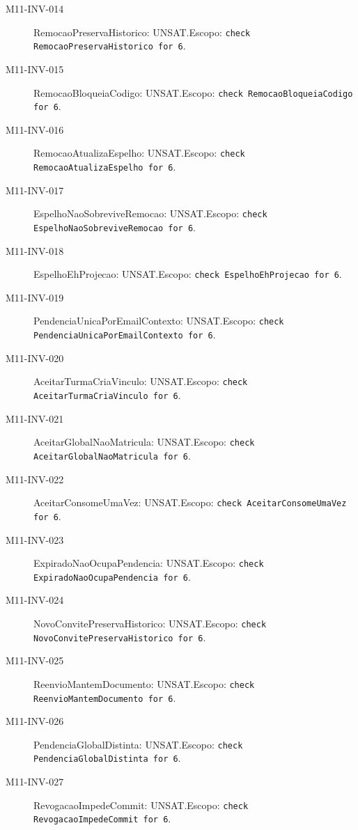 \begin{description}
\item[M11-INV-014] RemocaoPreservaHistorico: UNSAT.\newline Escopo: \texttt{check RemocaoPreservaHistorico for 6}.
\item[M11-INV-015] RemocaoBloqueiaCodigo: UNSAT.\newline Escopo: \texttt{check RemocaoBloqueiaCodigo for 6}.
\item[M11-INV-016] RemocaoAtualizaEspelho: UNSAT.\newline Escopo: \texttt{check RemocaoAtualizaEspelho for 6}.
\item[M11-INV-017] EspelhoNaoSobreviveRemocao: UNSAT.\newline Escopo: \texttt{check EspelhoNaoSobreviveRemocao for 6}.
\item[M11-INV-018] EspelhoEhProjecao: UNSAT.\newline Escopo: \texttt{check EspelhoEhProjecao for 6}.
\item[M11-INV-019] PendenciaUnicaPorEmailContexto: UNSAT.\newline Escopo: \texttt{check PendenciaUnicaPorEmailContexto for 6}.
\item[M11-INV-020] AceitarTurmaCriaVinculo: UNSAT.\newline Escopo: \texttt{check AceitarTurmaCriaVinculo for 6}.
\item[M11-INV-021] AceitarGlobalNaoMatricula: UNSAT.\newline Escopo: \texttt{check AceitarGlobalNaoMatricula for 6}.
\item[M11-INV-022] AceitarConsomeUmaVez: UNSAT.\newline Escopo: \texttt{check AceitarConsomeUmaVez for 6}.
\item[M11-INV-023] ExpiradoNaoOcupaPendencia: UNSAT.\newline Escopo: \texttt{check ExpiradoNaoOcupaPendencia for 6}.
\item[M11-INV-024] NovoConvitePreservaHistorico: UNSAT.\newline Escopo: \texttt{check NovoConvitePreservaHistorico for 6}.
\item[M11-INV-025] ReenvioMantemDocumento: UNSAT.\newline Escopo: \texttt{check ReenvioMantemDocumento for 6}.
\item[M11-INV-026] PendenciaGlobalDistinta: UNSAT.\newline Escopo: \texttt{check PendenciaGlobalDistinta for 6}.
\item[M11-INV-027] RevogacaoImpedeCommit: UNSAT.\newline Escopo: \texttt{check RevogacaoImpedeCommit for 6}.

\end{description}
